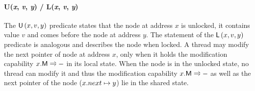 \paragraph{\textsf{U}(\textit{x}, \textit{v}, \textit{y}) / \textsf{L}(\textit{x}, \textit{v}, \textit{y})}
The $\textsf{U}\left(x, v, y\right)$ predicate states that the node at address $x$ is unlocked, it contains value $v$ and comes before the node at address $y$. The statement of the $\textsf{L}\left(x, v, y\right)$ predicate is analogous and describes the node when locked.
%
%
A thread may modify the next pointer of node at address $x$, only when it holds the modification capability $\modC{x}$ in its local state. When the node is in the unlocked state, no thread can modify it and thus the modification capability $\modC{x}$ as well as the next pointer of the node ($x.next \mapsto y$) lie in the shared state. 
